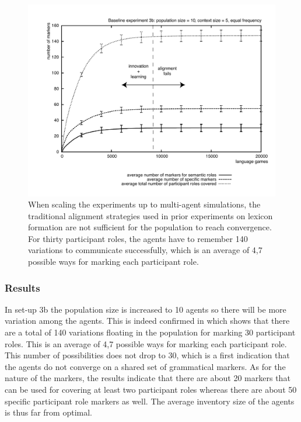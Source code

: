 \begin{figure}[ht]
\centerline{\includegraphics[width=\textwidth]{Chapter3/figs/graph-base3-size3b}}
  \caption[Baseline experiment 3b: number of markers]{When scaling the experiments up to multi-agent simulations, the traditional alignment strategies used in prior experiments on lexicon formation are not sufficient for the population to reach convergence. For thirty participant roles, the agents have to remember 140 variations to communicate successfully, which is an average of 4,7 possible ways for marking each participant role.}
   \label{f:base3-size3b}
\end{figure}

\subsubsection{Results}
 In set-up 3b the population size is increased to 10 agents so there will be more variation among the agents. This is indeed confirmed in  which shows that there are a total of 140 variations floating in the population for marking 30 participant roles. This is an average of 4,7 possible ways for marking each participant role. This number of possibilities does not drop to 30, which is a first indication that the agents do not converge on a shared set of grammatical markers. As for the nature of the markers, the results indicate that there are about 20 markers that can be used for covering at least two participant roles whereas there are about 50 specific participant role markers as well. The average inventory size of the agents is thus far from optimal.

